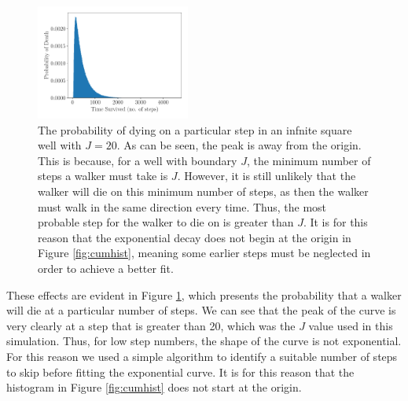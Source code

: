 \documentclass[journal]{IEEEtran}
\begin{document}
\begin{figure}[H]%
  \begin{center}
    \includegraphics[width=0.45\textwidth]{images/exp_plot.pdf}
    \caption{The probability of dying on a particular step in an infnite square
      well with $J=20$. As can be seen, the peak is away from the origin. This
      is because, for a well with boundary $J$, the minimum number of steps a
      walker must take is $J$. However, it is still unlikely that the walker
      will die on this minimum number of steps, as then the walker must walk in
      the same direction every time. Thus, the most probable step for the walker
      to die on is greater than $J$. It is for this reason that the exponential
      decay does not begin at the origin in Figure \ref{fig:cumhist}, meaning
      some earlier steps must be neglected in order to achieve a better fit.}
    \label{fig:hist}
  \end{center}
\end{figure}

These effects are evident in Figure \ref{fig:hist}, which presents the
probability that a walker will die at a particular number of steps. We can see
that the peak of the curve is very clearly at a step that is greater than 20,
which was the $J$ value used in this simulation. Thus, for low step numbers, the
shape of the curve is not exponential. For this reason we used a simple
algorithm to identify a suitable number of steps to skip before fitting the
exponential curve. It is for this reason that the histogram in Figure
\ref{fig:cumhist} does not start at the origin.
\end{document}
